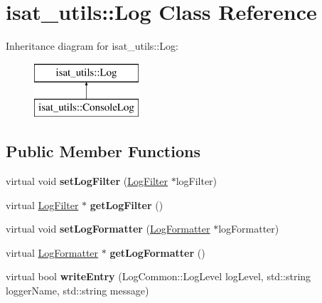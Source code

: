 \hypertarget{classisat__utils_1_1_log}{}\section{isat\+\_\+utils\+:\+:Log Class Reference}
\label{classisat__utils_1_1_log}
Inheritance diagram for isat\+\_\+utils\+:\+:Log\+:\begin{figure}[H]
\begin{center}
\leavevmode
\includegraphics[height=2.000000cm]{classisat__utils_1_1_log}
\end{center}
\end{figure}
\subsection*{Public Member Functions}
\begin{DoxyCompactItemize}
\item 
virtual void {\bfseries set\+Log\+Filter} (\hyperlink{classisat__utils_1_1_log_filter}{Log\+Filter} $\ast$log\+Filter)\hypertarget{classisat__utils_1_1_log_aa14ecc43296c5642d40f52b840a469c1}{}\label{classisat__utils_1_1_log_aa14ecc43296c5642d40f52b840a469c1}

\item 
virtual \hyperlink{classisat__utils_1_1_log_filter}{Log\+Filter} $\ast$ {\bfseries get\+Log\+Filter} ()\hypertarget{classisat__utils_1_1_log_adba1fc3e5dd13337aa4a4ed29e965f48}{}\label{classisat__utils_1_1_log_adba1fc3e5dd13337aa4a4ed29e965f48}

\item 
virtual void {\bfseries set\+Log\+Formatter} (\hyperlink{classisat__utils_1_1_log_formatter}{Log\+Formatter} $\ast$log\+Formatter)\hypertarget{classisat__utils_1_1_log_aea0cc11c87f4d3fbd911391dd3757968}{}\label{classisat__utils_1_1_log_aea0cc11c87f4d3fbd911391dd3757968}

\item 
virtual \hyperlink{classisat__utils_1_1_log_formatter}{Log\+Formatter} $\ast$ {\bfseries get\+Log\+Formatter} ()\hypertarget{classisat__utils_1_1_log_a9ce01a492d2b707963f09afba58f9b9c}{}\label{classisat__utils_1_1_log_a9ce01a492d2b707963f09afba58f9b9c}

\item 
virtual bool {\bfseries write\+Entry} (Log\+Common\+::\+Log\+Level log\+Level, std\+::string logger\+Name, std\+::string message)\hypertarget{classisat__utils_1_1_log_a1d590f19a1f4f82b7709bb0d327096ba}{}\label{classisat__utils_1_1_log_a1d590f19a1f4f82b7709bb0d327096ba}

\end{DoxyCompactItemize}
